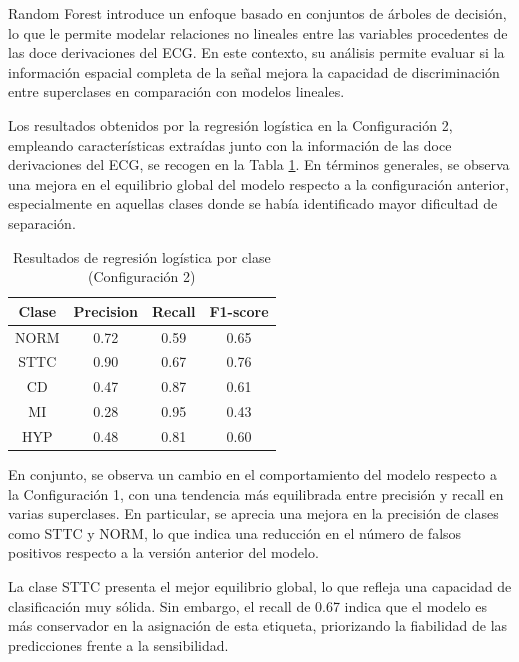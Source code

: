 \documentclass[12pt,a4paper,twoside]{book}
\begin{document}
Random Forest introduce un enfoque basado en conjuntos de árboles de decisión, lo que le permite modelar relaciones no lineales entre las variables procedentes de las doce derivaciones del ECG. 
En este contexto, su análisis permite evaluar si la información espacial completa de la señal mejora la capacidad de discriminación entre superclases en comparación con modelos lineales.

\vspace{0.5cm}

Los resultados obtenidos por la regresión logística en la Configuración 2, empleando características extraídas junto con la información de las doce derivaciones del ECG, se recogen en la Tabla \ref{tab:metrics_clase_rf_feat12}. 
En términos generales, se observa una mejora en el equilibrio global del modelo respecto a la configuración anterior, especialmente en aquellas clases donde se había identificado mayor dificultad de separación.

\begin{table}[H]
	\centering
	\begin{tabular}{|c|c|c|c|}
	\hline
	\textbf{Clase} & \textbf{Precision} & \textbf{Recall} & \textbf{F1-score} \\
	\hline
	NORM & 0.72 & 0.59 & 0.65 \\
	STTC & 0.90 & 0.67 & 0.76 \\
	CD   & 0.47 & 0.87 & 0.61 \\
	MI   & 0.28 & 0.95 & 0.43 \\
	HYP  & 0.48 & 0.81 & 0.60 \\
	\hline
	\end{tabular}
	\caption{Resultados de regresión logística por clase (Configuración 2)}
	\label{tab:metrics_clase_rf_feat12}
\end{table}

En conjunto, se observa un cambio en el comportamiento del modelo respecto a la Configuración 1, con una tendencia más equilibrada entre precisión y recall en varias superclases. 
En particular, se aprecia una mejora en la precisión de clases como STTC y NORM, lo que indica una reducción en el número de falsos positivos respecto a la versión anterior del modelo.

La clase STTC presenta el mejor equilibrio global, lo que refleja una capacidad de clasificación muy sólida. 
Sin embargo, el recall de 0.67 indica que el modelo es más conservador en la asignación de esta etiqueta, priorizando la fiabilidad de las predicciones frente a la sensibilidad.
\end{document}
